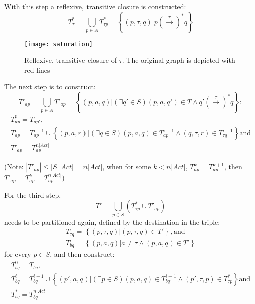 With this step a reflexive, transitive closure is constructed:
\begin{equation*}
	{T^{*}_{\tau}=\bigcup_{p\in A}T^{*}_{\tau p}=\left\{\left(p,\tau,q\right)|p\left(\stackrel{\tau}{\rightarrow}\right)^{*}q\right\}}
\end{equation*}

\begin{figure}[!ht]
\centering
\texttt{[image: saturation]}
\caption{Reflexive, transitive closure of $\tau$. The original graph is depicted with red lines}
\label{fig:saturation}
\end{figure}

The next step is to construct:
\begin{equation}\label{eq:tap}
		T'_{ap}=\bigcup_{p\in A}T'_{ap}=\left\{\left(p,a,q\right)|\left(\exists q'\in S\right)\left(p,a,q'\right)\in T\wedge q'\left(\stackrel{\tau}{\rightarrow}\right)^{*}q\right\}:
\end{equation}
\begin{equation*}
	\begin{array}{lcl}
		T^{0}_{ap}=T_{ap'},\\
		T^{i}_{ap}=T^{i-1}_{ap}\cup \left\{\left(p,a,r\right)|\left(\exists q\in S\right)\left(p,a,q\right)\in T^{i-1}_{ap}\wedge \left(q,\tau,r\right)\in T^{i-1}_{\tau q}\right\} \text{and} \\
		T'_{ap}=T^{n|Act|}_{ap}
	\end{array}
\end{equation*}

(Note: $|T'_{ap}|\leq |S||Act|=n|Act|$, when for some $k<n|Act|$, $T^{k}_{ap}=T^{k+1}_{ap}$, then $T'_{ap}=T^{k}_{ap}=T^{n|Act|}_{ap}$)

For the third step, 
\begin{equation*}
	T'=\bigcup_{p\in S}\left(T^{*}_{\tau p}\cup T'_{ap}\right)
\end{equation*}
needs to be partitioned again, defined by the destination in the triple:
\begin{equation*}
	\begin{array}{lcl}
		T_{\tau q}=\left\{\left(p,\tau,q\right)|\left(p,\tau,q\right)\in T'\right\}, \text{and}\\
		T_{bq}=\left\{\left(p,a,q\right)|a\neq\tau\wedge\left(p,a,q\right)\in T'\right\}				    
	\end{array}
\end{equation*}
for every $p\in S$, and then construct:
\begin{equation*}
	\begin{array}{lcl}
		T^{0}_{bq}=T_{bq},\\
		T^{i}_{bq}=T^{i-1}_{bq}\cup\left\{\left(p',a,q\right)|\left(\exists p\in S\right)\left(p,a,q\right)\in T^{i-1}_{bq}\wedge\left(p',\tau,p\right)\in T^{*}_{\tau p}\right\} \text{and}\\
		T^{*}_{bq}=T^{n|Act|}_{bq}
	\end{array}
\end{equation*}

